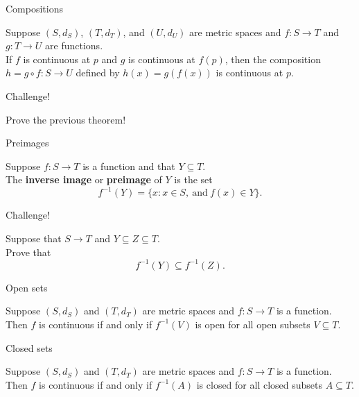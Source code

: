 \documentclass{beamer}
\begin{document}
\begin{frame}{Compositions}
\begin{thm}
Suppose $(S,d_S)$, $(T,d_T)$, and $(U,d_U)$ are metric spaces and $f: S\rightarrow T$ and $g: T\rightarrow U$ are functions.\\
\pause
If $f$ is continuous at $p$ and $g$ is continuous at $f(p)$, then the composition $h = g\circ f: S\rightarrow U$ defined by $h(x) = g(f(x))$ is continuous at $p$.
\end{thm}
\end{frame}

\begin{frame}{Challenge!}
\begin{prob}
Prove the previous theorem!
\end{prob}
\end{frame}

\begin{frame}{Preimages}
\begin{defn}
Suppose $f: S\rightarrow T$ is a function and that $Y\subseteq T$.\\
\pause
The \textbf{inverse image} or \textbf{preimage} of $Y$ is the set
$$f^{-1}(Y) = \{x: x\in S,\ \text{and}\ f(x)\in Y\}.$$
\end{defn}
\end{frame}

\begin{frame}{Challenge!}
\begin{prob}
Suppose that $S\rightarrow T$ and $Y\subseteq Z\subseteq T$.\\
Prove that
$$f^{-1}(Y)\subseteq f^{-1}(Z).$$
\end{prob}
\end{frame}


\begin{frame}{Open sets}
\begin{thm}
Suppose $(S,d_S)$ and $(T,d_T)$ are metric spaces and $f: S\rightarrow T$ is a function.\\
\pause
Then $f$ is continuous if and only if $f^{-1}(V)$ is open for all open subsets $V\subseteq T$.
\end{thm}
\end{frame}

\begin{frame}{Closed sets}
\begin{thm}
Suppose $(S,d_S)$ and $(T,d_T)$ are metric spaces and $f: S\rightarrow T$ is a function.\\
\pause
Then $f$ is continuous if and only if $f^{-1}(A)$ is closed for all closed subsets $A\subseteq T$.
\end{thm}
\end{frame}
\end{document}
